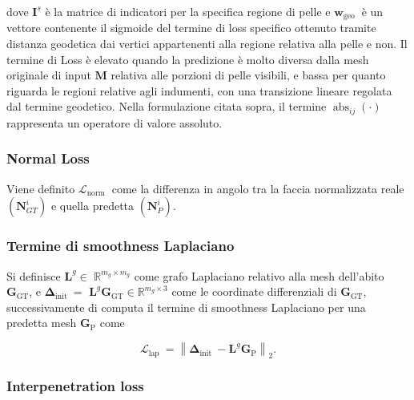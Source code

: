 \medskip

dove $\mathbf{I}^{s}$ è la matrice di indicatori per la specifica regione di pelle e $\boldsymbol{w}_{\text {geo }}$ è un vettore contenente il sigmoide del termine di loss specifico ottenuto tramite distanza geodetica dai vertici appartenenti alla regione relativa alla pelle e non. Il termine di Loss è elevato quando la predizione è molto diversa dalla mesh originale di input $\mathbf{M}$ relativa alle porzioni di pelle visibili, e bassa per quanto riguarda le regioni relative agli indumenti, con una transizione lineare regolata dal termine geodetico. Nella formulazione citata sopra, il termine $\operatorname{abs}_{i j}(\cdot)$ rappresenta un operatore di valore assoluto.  
\medskip

\subsubsection{Normal Loss}

\medskip

Viene definito $\mathcal{L}_{\text {norm }}$ come la differenza in angolo tra la faccia normalizzata reale $\left(\mathbf{N}_{G T}^{i}\right)$ e quella predetta $\left(\mathbf{N}_{P}^{i}\right)$.

\medskip

\subsubsection{Termine di smoothness Laplaciano}

\medskip

Si definisce $\mathbf{L}^{g} \in$ $\mathbb{R}^{m_{g} \times m_{g}}$ come grafo Laplaciano relativo alla mesh dell'abito $\mathbf{G}_{\mathrm{GT}}$, e $\boldsymbol{\Delta}_{\text {init }}=$ $\mathbf{L}^{g} \mathbf{G}_{\mathrm{GT}} \in \mathbb{R}^{m_{g} \times 3}$ come le coordinate differenziali di $\mathbf{G}_{\mathrm{GT}}$, successivamente di computa il termine di smoothness Laplaciano per una predetta mesh $\mathbf{G}_{\mathrm{P}}$ come 

\medskip

$$
\mathcal{L}_{\text {lap }}=\left\|\boldsymbol{\Delta}_{\text {init }}-\mathbf{L}^{g} \mathbf{G}_{\mathrm{P}}\right\|_{2} .
$$

\medskip

\subsubsection{Interpenetration loss}

